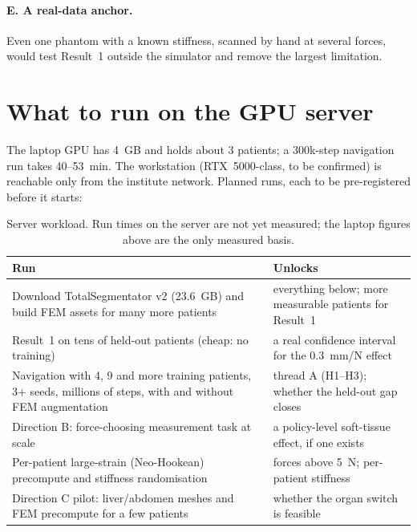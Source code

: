 \documentclass[10pt,a4paper,twocolumn]{article}
\begin{document}
\paragraph{E. A real-data anchor.} Even one phantom with a known stiffness, scanned by hand at several forces, would
test Result~1 outside the simulator and remove the largest limitation.

\section{What to run on the GPU server}
\label{sec:server}

The laptop GPU has 4~GB and holds about 3 patients; a 300k-step navigation run takes 40--53~min. The workstation
(RTX~5000-class, to be confirmed) is reachable only from the institute network. Planned runs, each to be
pre-registered before it starts:

\begin{table}[h]
\centering\footnotesize
\begin{tabularx}{\linewidth}{@{}Xp{2.6cm}@{}}
\toprule
Run & Unlocks \\
\midrule
Download TotalSegmentator v2 (23.6~GB) and build FEM assets for many more patients & everything below; more
measurable patients for Result~1 \\
Result~1 on tens of held-out patients (cheap: no training) & a real confidence interval for the 0.3~mm/N effect \\
Navigation with 4, 9 and more training patients, 3+ seeds, millions of steps, with and without FEM augmentation &
thread A (H1--H3); whether the held-out gap closes \\
Direction B: force-choosing measurement task at scale & a policy-level soft-tissue effect, if one exists \\
Per-patient large-strain (Neo-Hookean) precompute and stiffness randomisation & forces above 5~N; per-patient
stiffness \\
Direction C pilot: liver/abdomen meshes and FEM precompute for a few patients & whether the organ switch is
feasible \\
\bottomrule
\end{tabularx}
\caption{Server workload. Run times on the server are not yet measured; the laptop figures above are the only
measured basis.}
\end{table}

\end{document}
